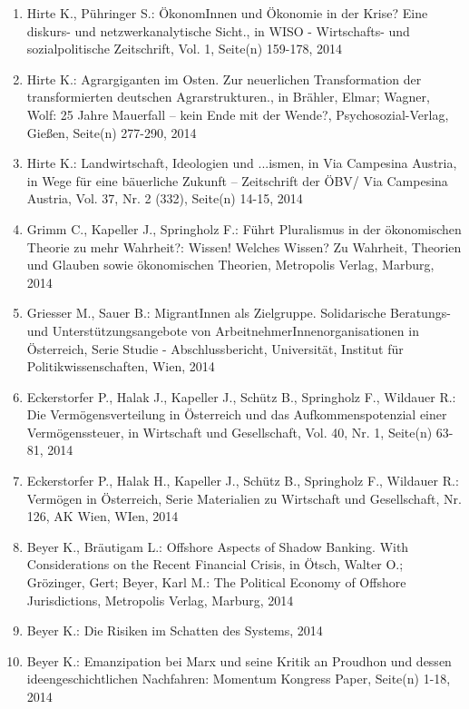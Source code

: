 \begin{enumerate}
	 \item Hirte K., Pühringer S.: ÖkonomInnen und Ökonomie in der Krise? Eine diskurs- und netzwerkanalytische Sicht., in WISO - Wirtschafts- und sozialpolitische Zeitschrift, Vol. 1, Seite(n) 159-178, 2014
	 \item Hirte K.: Agrargiganten im Osten. Zur neuerlichen Transformation der transformierten deutschen Agrarstrukturen., in Brähler, Elmar; Wagner, Wolf: 25 Jahre Mauerfall – kein Ende mit der Wende?, Psychosozial-Verlag, Gießen, Seite(n) 277-­290, 2014
	 \item Hirte K.: Landwirtschaft, Ideologien und \glqq ...ismen\grqq{}, in Via Campesina Austria, in Wege für eine bäuerliche Zukunft – Zeitschrift der ÖBV/ Via Campesina Austria, Vol. 37, Nr. 2 (332), Seite(n) 14-15, 2014
	 \item Grimm C., Kapeller J., Springholz F.: Führt Pluralismus in der ökonomischen Theorie zu mehr Wahrheit?: Wissen! Welches Wissen? Zu Wahrheit, Theorien und Glauben sowie ökonomischen Theorien, Metropolis Verlag, Marburg, 2014
	 \item Griesser M., Sauer B.: MigrantInnen als Zielgruppe. Solidarische Beratungs- und Unterstützungsangebote von ArbeitnehmerInnenorganisationen in Österreich, Serie Studie - Abschlussbericht, Universität, Institut für Politikwissenschaften, Wien, 2014
	 \item Eckerstorfer P., Halak J., Kapeller J., Schütz B., Springholz F., Wildauer R.: Die Vermögensverteilung in Österreich und das Aufkommenspotenzial einer Vermögenssteuer, in Wirtschaft und Gesellschaft, Vol. 40, Nr. 1, Seite(n) 63-81, 2014
	 \item Eckerstorfer P., Halak H., Kapeller J., Schütz B., Springholz F., Wildauer R.: Vermögen in Österreich, Serie Materialien zu Wirtschaft und Gesellschaft, Nr. 126, AK Wien, WIen, 2014
	 \item Beyer K., Bräutigam L.: Offshore Aspects of Shadow Banking. With Considerations on the Recent Financial Crisis, in Ötsch, Walter O.; Grözinger, Gert; Beyer, Karl M.: The Political Economy of Offshore Jurisdictions, Metropolis Verlag, Marburg, 2014
	 \item Beyer K.: Die Risiken im Schatten des Systems, 2014
	 \item Beyer K.: Emanzipation bei Marx und seine Kritik an Proudhon und dessen ideengeschichtlichen Nachfahren: Momentum Kongress Paper, Seite(n) 1-18, 2014
\end{enumerate}
